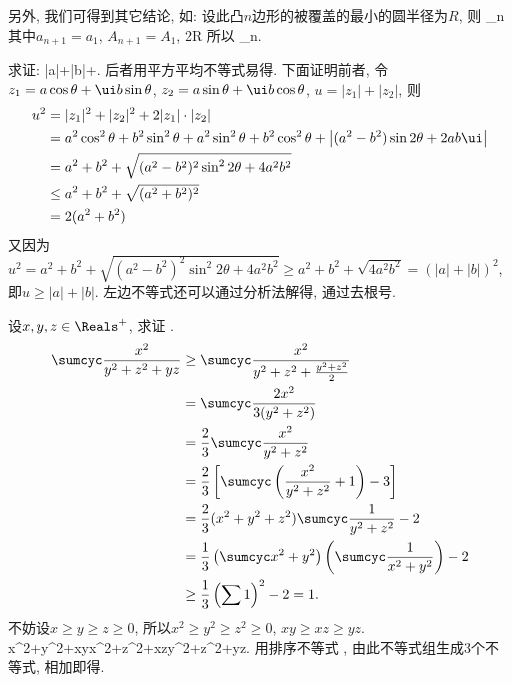 另外, 我们可得到其它结论, 如: 设此凸$n$边形的被覆盖的最小的圆半径为$R$, 则
\Delta_{n}\le{}\sum{}
\eee
其中$a_{n+1}=a_{1}$, $A_{n+1}=A_{1}$, 
\bee
2R\le\sum{}
\eee
所以
\Delta_{n}\le{}\sum{}\sum{}.
\eee
\ea

\bq{}{}
求证: 
\bee
|a|+|b|\le{}+\le{}.
\eee
\eq
\ba
后者用平方平均不等式易得. 下面证明前者, 令$z_{1}=a\cos\theta+\ui b\sin\theta$, $z_{2}=a\sin\theta+\ui b\cos\theta$,
$u=|z_{1}|+|z_{2}|$, 则
\begin{align*}
u^{2} & =|z_{1}|^{2}+|z_{2}|^{2}+2|z_{1}|\cdot|z_{2}|\\
 & =a^{2}\cos^{2}\theta+b^{2}\sin^{2}\theta+a^{2}\sin^{2}\theta+b^{2}\cos^{2}\theta+\left|(a^{2}-b^{2})\sin2\theta+2ab\ui\right|\\
 & =a^{2}+b^{2}+\sqrt{(a^{2}-b^{2})^{2}\sin^{2}2\theta+4a^{2}b^{2}}\\
 & \le a^{2}+b^{2}+\sqrt{(a^{2}+b^{2})^{2}}\\
 & =2(a^{2}+b^{2})
\end{align*}
又因为$u^{2}=a^{2}+b^{2}+\sqrt{(a^{2}-b^{2})^{2}\sin^{2}2\theta+4a^{2}b^{2}}\ge a^{2}+b^{2}+\sqrt{4a^{2}b^{2}}=(|a|+|b|)^{2}$,
即$u\ge|a|+|b|$. 左边不等式还可以通过分析法解得, 通过去根号.
\ea

\bq{}{}
设$x,y,z\in\Reals^{+}$, 求证
\bee
\sumcyc{}.
\eee
\eq
\ba
\begin{align*}
\sumcyc\frac{x^{2}}{y^{2}+z^{2}+yz} & \ge\sumcyc\frac{x^{2}}{y^{2}+z^{2}+\frac{y^{2}+z^{2}}{2}}\\
 & =\sumcyc\frac{2x^{2}}{3(y^{2}+z^{2})}\\
 & =\frac{2}{3}\sumcyc\frac{x^{2}}{y^{2}+z^{2}}\\
 & =\frac{2}{3}\left[\sumcyc\left(\frac{x^{2}}{y^{2}+z^{2}}+1\right)-3\right]\\
 & =\frac{2}{3}(x^{2}+y^{2}+z^{2})\sumcyc\frac{1}{y^{2}+z^{2}}-2\\
 & =\frac{1}{3}\left(\sumcyc x^{2}+y^{2}\right)\left(\sumcyc\frac{1}{x^{2}+y^{2}}\right)-2\\
 & \ge\frac{1}{3}\left(\sum1\right)^{2}-2=1.
\end{align*}
\ea
\ba
不妨设$x\ge y\ge z\ge0$, 所以$x^{2}\ge y^{2}\ge z^{2}\ge0$, $xy\ge xz\ge yz$.
\bee
x^{2}+y^{2}+xy\ge x^{2}+z^{2}+xz\ge y^{2}+z^{2}+yz.
\eee
用排序不等式
\bee
\sumcyc{}\ge\sumcyc{}\ge\sumcyc{}\ge\sumcyc{},
\eee
由此不等式组生成$3$个不等式, 相加即得.
\ea

